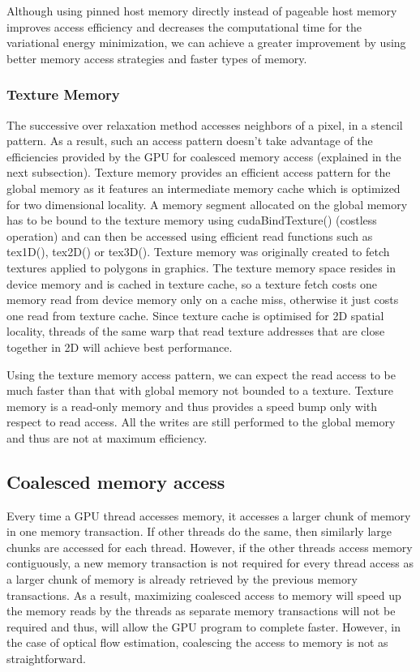 \documentclass[english]{article}
\begin{document}
	Although using pinned host memory directly instead of pageable host memory improves access efficiency and decreases the computational time for the variational energy minimization, we can achieve a greater improvement by using better memory access strategies and faster types of memory.

	\subsubsection{Texture Memory}
	The successive over relaxation method accesses neighbors of a pixel, in a stencil pattern. As a result, such an access pattern doesn’t take advantage of the efficiencies provided by the GPU for coalesced memory access (explained in the next subsection). Texture memory provides an efficient access pattern for the global memory as it features an intermediate memory cache which is optimized for two dimensional locality. A memory segment allocated on the global memory has to be bound to the texture memory using cudaBindTexture() (costless operation) and can then be accessed using efficient read functions such as tex1D(), tex2D() or tex3D(). Texture memory was originally created to fetch textures applied to polygons in graphics. The texture memory space resides in device memory and is cached in texture cache, so a texture fetch costs one memory read from device memory only on a cache miss, otherwise it just costs one read from texture cache. Since texture cache is optimised for 2D spatial locality, threads of the same warp that read texture addresses that are close together in 2D will achieve best performance. 
	
	\pagebreak 

	Using the texture memory access pattern, we can expect the read access to be much faster than that with global memory not bounded to a texture. Texture memory is a read-only memory and thus provides a speed bump only with respect to read access. All the writes are still performed to the global memory and thus are not at maximum efficiency. 

	\subsection{Coalesced memory access}
	Every time a GPU thread accesses memory, it accesses a larger chunk of memory in one memory transaction. If other threads do the same, then similarly large chunks are accessed for each thread. However, if the other threads access memory contiguously, a new memory transaction is not required for every thread access as a larger chunk of memory is already retrieved by the previous memory transactions. As a result, maximizing coalesced access to memory will speed up the memory reads by the threads as separate memory transactions will not be required and thus, will allow the GPU program to complete faster. However, in the case of optical flow estimation, coalescing the access to memory is not as straightforward. 
\end{document}
